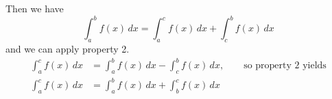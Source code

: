Then we have
\[\int_a^b f(x)\,dx=\int_a^c f(x)\,dx+\int_c^b f(x)\,dx\]
and we can apply property 2.
\begin{align*}
\int_a^c f(x)\,dx &=\int_a^b f(x)\,dx-\int_c^b f(x)\,dx, \qquad \text{so property 2 yields}\\
\int_a^c f(x)\,dx &=\int_a^b f(x)\,dx+\int_b^c f(x)\,dx 
\end{align*}

%		
%

